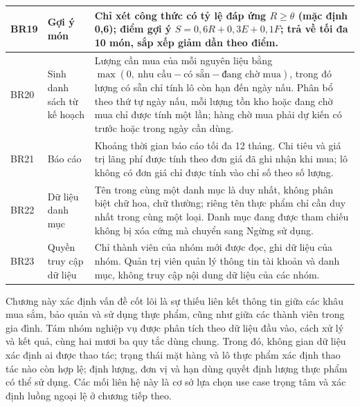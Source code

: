 {\begin{longtable}{|C{1.25cm}|L{3.0cm}|L{\dimexpr{}\arrayrulewidth-1.25cm-3.0cm\relax}|}
BR19 & Gợi ý món & Chỉ xét công thức có tỷ lệ đáp ứng $R \ge \theta$ (mặc định 0,6); điểm gợi ý $S = 0{,}6R + 0{,}3E + 0{,}1F$; trả về tối đa 10 món, sắp xếp giảm dần theo điểm.\\ \hline
BR20 & Sinh danh sách từ kế hoạch & Lượng cần mua của mỗi nguyên liệu bằng $\max(0,\ \text{nhu cầu} - \text{có sẵn} - \text{đang chờ mua})$, trong đó lượng có sẵn chỉ tính lô còn hạn đến ngày nấu. Phân bổ theo thứ tự ngày nấu, mỗi lượng tồn kho hoặc đang chờ mua chỉ được tính một lần; hàng chờ mua phải dự kiến có trước hoặc trong ngày cần dùng.\\ \hline
BR21 & Báo cáo & Khoảng thời gian báo cáo tối đa 12 tháng. Chi tiêu và giá trị lãng phí được tính theo đơn giá đã ghi nhận khi mua; lô không có đơn giá chỉ được tính vào chỉ số theo số lượng.\\ \hline
BR22 & Dữ liệu danh mục & Tên trong cùng một danh mục là duy nhất, không phân biệt chữ hoa, chữ thường; riêng tên thực phẩm chỉ cần duy nhất trong cùng một loại. Danh mục đang được tham chiếu không bị xóa cứng mà chuyển sang Ngừng sử dụng.\\ \hline
BR23 & Quyền truy cập dữ liệu & Chỉ thành viên của nhóm mới được đọc, ghi dữ liệu của nhóm. Quản trị viên quản lý thông tin tài khoản và danh mục, không truy cập nội dung dữ liệu của các nhóm.\\ \hline
\end{longtable}
}

Chương này xác định vấn đề cốt lõi là sự thiếu liên kết thông tin giữa các khâu mua sắm, bảo quản và sử dụng thực phẩm, cũng như giữa các thành viên trong gia đình. Tám nhóm nghiệp vụ được phân tích theo dữ liệu đầu vào, cách xử lý và kết quả, cùng hai mươi ba quy tắc dùng chung. Trong đó, không gian dữ liệu xác định ai được thao tác; trạng thái mặt hàng và lô thực phẩm xác định thao tác nào còn hợp lệ; định lượng, đơn vị và hạn dùng quyết định lượng thực phẩm có thể sử dụng. Các mối liên hệ này là cơ sở lựa chọn use case trọng tâm và xác định luồng ngoại lệ ở chương tiếp theo.
